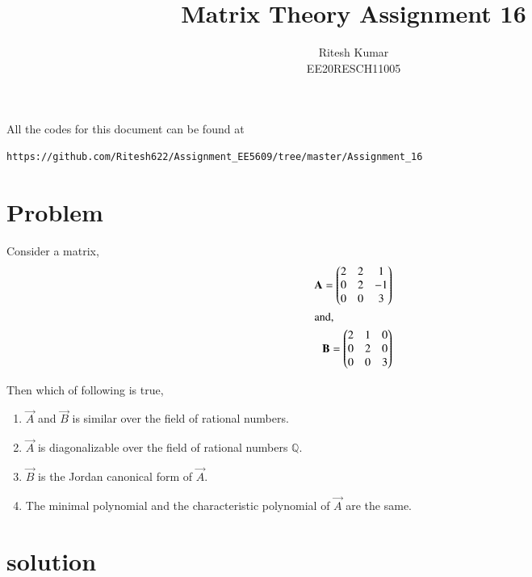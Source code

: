 \documentclass[journal,12pt,twocolumn]{IEEEtran}
\numberwithin{table}{section}
\begin{document}
     \def\rightbox#1{\makebox[0in][r]{#1}}
     \def\centbox#1{\makebox[0in]{#1}}
     \def\topbox#1{\raisebox{-\baselineskip}[0in][0in]{#1}}
     \def\midbox#1{\raisebox{-0.5\baselineskip}[0in][0in]{#1}}
\vspace{3cm}
\title{Matrix Theory Assignment 16}
\author{Ritesh Kumar \\ EE20RESCH11005}
\maketitle
\newpage
\bigskip
\renewcommand{\thefigure}{\theenumi}
\renewcommand{\thetable}{\theenumi}
All the codes for this document can be found at
%
\begin{lstlisting}
https://github.com/Ritesh622/Assignment_EE5609/tree/master/Assignment_16
\end{lstlisting}
%
	\section{Problem}
	Consider a matrix,
	\begin{align}
	\mathbf{A} = \begin{pmatrix}2 & 2 & 1 \\0 & 2 & -1 \\ 0 & 0 & 3\end{pmatrix}\\ \intertext{and,} \mathbf{B} = \begin{pmatrix}2 & 1 & 0 \\ 0 & 2 & 0 \\ 0 & 0 & 3\end{pmatrix}
	\end{align}
	
Then which of following is true,
\begin{enumerate}
\item $\vec{A}$ and $\vec{B}$ is similar over the field of rational numbers.
\item $\vec{A}$ is diagonalizable over the field of rational numbers $\mathbb{Q}$.
\item $\vec{B}$ is the Jordan canonical form of $\vec{A}$.
\item The minimal polynomial and the characteristic polynomial of $\vec{A}$ are the same.
\end{enumerate}
	\section{solution}
\end{document}
